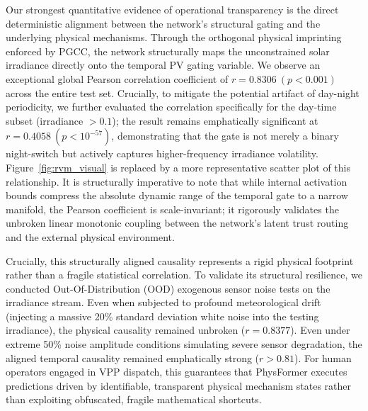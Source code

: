 Our strongest quantitative evidence of operational transparency is the direct deterministic alignment between the network's structural gating and the underlying physical mechanisms. Through the orthogonal physical imprinting enforced by PGCC, the network structurally maps the unconstrained solar irradiance directly onto the temporal PV gating variable. We observe an exceptional global Pearson correlation coefficient of $r = 0.8306 \ (p < 0.001)$ across the entire test set. Crucially, to mitigate the potential artifact of day-night periodicity, we further evaluated the correlation specifically for the day-time subset (irradiance $> 0.1$); the result remains emphatically significant at $r = 0.4058 \ (p < 10^{-57})$, demonstrating that the gate is not merely a binary night-switch but actively captures higher-frequency irradiance volatility. Figure~\ref{fig:rvm_visual} is replaced by a more representative scatter plot of this relationship. It is structurally imperative to note that while internal activation bounds compress the absolute dynamic range of the temporal gate to a narrow manifold, the Pearson coefficient is scale-invariant; it rigorously validates the unbroken linear monotonic coupling between the network's latent trust routing and the external physical environment.

Crucially, this structurally aligned causality represents a rigid physical footprint rather than a fragile statistical correlation. To validate its structural resilience, we conducted Out-Of-Distribution (OOD) exogenous sensor noise tests on the irradiance stream. Even when subjected to profound meteorological drift (injecting a massive 20\% standard deviation white noise into the testing irradiance), the physical causality remained unbroken ($r = 0.8377$). Even under extreme 50\% noise amplitude conditions simulating severe sensor degradation, the aligned temporal causality remained emphatically strong ($r > 0.81$).
 For human operators engaged in VPP dispatch, this guarantees that PhysFormer executes predictions driven by identifiable, transparent physical mechanism states rather than exploiting obfuscated, fragile mathematical shortcuts.


